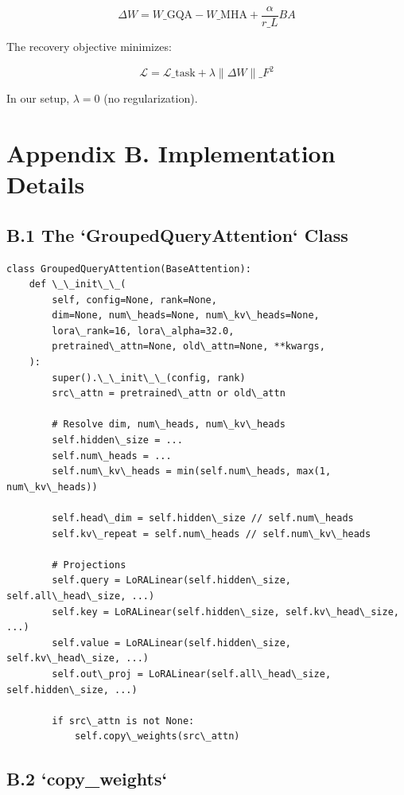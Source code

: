 \[
\Delta W = W\_\text{GQA} - W\_\text{MHA} + \frac{\alpha}{r\_L} B A
\tag{A.14}
\]

The recovery objective minimizes:

\[
\mathcal{L} = \mathcal{L}\_\text{task} + \lambda \|\Delta W\|\_F^2
\tag{A.15}
\]

In our setup, $\lambda = 0$ (no regularization).


\section{Appendix B. Implementation Details}

\subsection{B.1 The `GroupedQueryAttention` Class}

\begin{lstlisting}
class GroupedQueryAttention(BaseAttention):
    def \_\_init\_\_(
        self, config=None, rank=None,
        dim=None, num\_heads=None, num\_kv\_heads=None,
        lora\_rank=16, lora\_alpha=32.0,
        pretrained\_attn=None, old\_attn=None, **kwargs,
    ):
        super().\_\_init\_\_(config, rank)
        src\_attn = pretrained\_attn or old\_attn
        
        # Resolve dim, num\_heads, num\_kv\_heads
        self.hidden\_size = ...
        self.num\_heads = ...
        self.num\_kv\_heads = min(self.num\_heads, max(1, num\_kv\_heads))
        
        self.head\_dim = self.hidden\_size // self.num\_heads
        self.kv\_repeat = self.num\_heads // self.num\_kv\_heads
        
        # Projections
        self.query = LoRALinear(self.hidden\_size, self.all\_head\_size, ...)
        self.key = LoRALinear(self.hidden\_size, self.kv\_head\_size, ...)
        self.value = LoRALinear(self.hidden\_size, self.kv\_head\_size, ...)
        self.out\_proj = LoRALinear(self.all\_head\_size, self.hidden\_size, ...)
        
        if src\_attn is not None:
            self.copy\_weights(src\_attn)
\end{lstlisting}

\subsection{B.2 `copy\_weights`}

